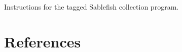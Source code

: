 \documentclass[12pt]{article}\usepackage[]{graphicx}\usepackage[]{color}
\begin{document}
\begin{appendices}
Instructions for the tagged Sablefish collection program.
\begin{center} \end{center}

\clearpage

\end{appendices}

\clearpage

\hypertarget{references}{%
\section{References}\label{references}}

\noindent \vspace{-2em} \setlength{\parindent}{-0.2in} \setlength{\leftskip}{0.2in} \setlength{\parskip}{8pt}
\end{document}
